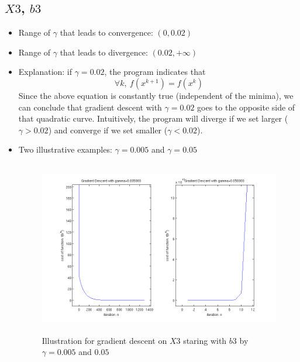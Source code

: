 \documentclass[11pt,a4paper]{article}
\begin{document}
\subsection{$X3$, $b3$}
\begin{itemize}
    \item Range of $\gamma$ that leads to convergence: $(0,0.02)$
    \item Range of $\gamma$ that leads to divergence: $(0.02,+\infty)$
    \item Explanation: if $\gamma = 0.02$, the program indicates that 
        $$ \forall k,\ f(x^{k+1}) = f(x^{k})$$ 
        Since the above equation is constantly true (independent of the
        minima), we can conclude that gradient descent with $\gamma = 0.02$ goes 
        to the opposite side of that quadratic curve. Intuitively, the program 
        will diverge if we set larger ($\gamma>0.02$) and converge if we set smaller
        ($\gamma<0.02$).
    \item Two illustrative examples: $\gamma = 0.005$ and $\gamma = 0.05$
        \begin{figure}[h]
            \centering
            \includegraphics[width=6in,height=3in]{../ps1_matlab/3.png}
            \caption{Illustration for gradient descent on $X3$ staring with
                $b3$ by $\gamma = 0.005$ and $0.05$}
        \end{figure}
\end{itemize}

\newpage
\end{document}
